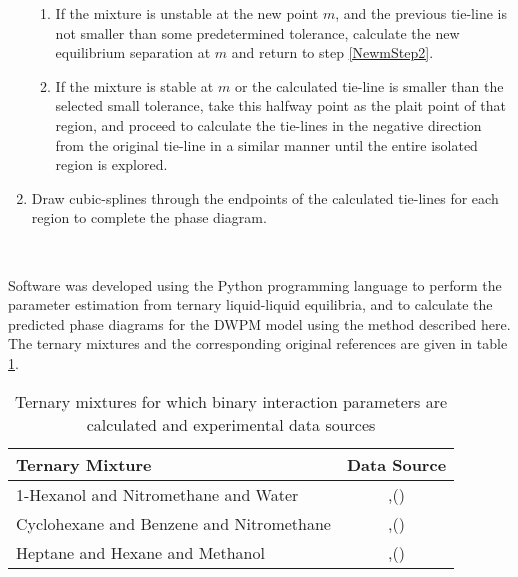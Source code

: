 \begin{enumerate}
\begin{enumerate}
	\item If the mixture is unstable at the new point $m$, and the previous tie-line is not smaller than some predetermined tolerance, calculate the new equilibrium separation at $m$ and return to step \ref{NewmStep2}.\
	\item If the mixture is stable at $m$ or the calculated tie-line is smaller than the selected small tolerance, take this halfway point as the plait point of that region, and proceed to calculate the tie-lines in the negative direction from the original tie-line in a similar manner until the entire isolated region is explored.\
\end{enumerate}
\item Draw cubic-splines through the endpoints of the calculated tie-lines for each region to complete the phase diagram.\
\end{enumerate}\

Software was developed using the Python programming language to perform the parameter estimation from ternary liquid-liquid equilibria, and to calculate the predicted phase diagrams for the DWPM model using the method described here. The ternary mixtures and the corresponding original references are given in table \ref{TernarySystemsandReferences}.\

\begin{table}[h]
\caption{Ternary mixtures for which binary interaction parameters are calculated and experimental data sources}
\centering
\begin{tabular}{lc}
\toprule
\textbf{Ternary Mixture}&\textbf{Data Source}\\
\midrule
1-Hexanol and Nitromethane and Water&\citeauthor{SazonovMarkuzinFilippov},(\citeyear{SazonovMarkuzinFilippov}) \cite{SazonovMarkuzinFilippov} \\
Cyclohexane and Benzene and Nitromethane& \citeauthor{WeckHunt},(\citeyear{WeckHunt}) \cite{WeckHunt} \\
Heptane and Hexane and Methanol& \citeauthor{Wittrig},(\citeyear{Wittrig}) \cite{Wittrig} \\
\bottomrule
\end{tabular}\\
\label{TernarySystemsandReferences}
\end{table}\
